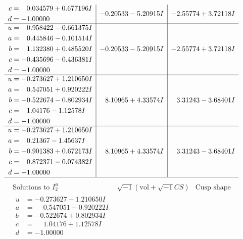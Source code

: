\documentclass[1p]{elsarticle_modified}
\theoremstyle{definition}
\newcommand{\I}{\sqrt{-1}}
\begin{document}
$$\begin{array}{c|c|c}
\begin{aligned}
c &= \phantom{-}0.034579 + 0.677196 I \\
d &= -1.00000\phantom{ +0.000000I}\end{aligned}
 & -0.20533 - 5.20915 I & -2.55774 + 3.72118 I \\ \hline\begin{aligned}
u &= \phantom{-}0.958422 - 0.661375 I \\
a &= \phantom{-}0.445846 - 0.101514 I \\
b &= \phantom{-}1.132380 + 0.485520 I \\
c &= -0.435696 - 0.436381 I \\
d &= -1.00000\phantom{ +0.000000I}\end{aligned}
 & -0.20533 - 5.20915 I & -2.55774 + 3.72118 I \\ \hline\begin{aligned}
u &= -0.273627 + 1.210650 I \\
a &= \phantom{-}0.547051 + 0.920222 I \\
b &= -0.522674 - 0.802934 I \\
c &= \phantom{-}1.04176 - 1.12578 I \\
d &= -1.00000\phantom{ +0.000000I}\end{aligned}
 & \phantom{-}8.10965 + 4.33574 I & \phantom{-}3.31243 - 3.68401 I \\ \hline\begin{aligned}
u &= -0.273627 + 1.210650 I \\
a &= \phantom{-}0.21367 - 1.45637 I \\
b &= -0.901383 + 0.672173 I \\
c &= \phantom{-}0.872371 - 0.074382 I \\
d &= -1.00000\phantom{ +0.000000I}\end{aligned}
 & \phantom{-}8.10965 + 4.33574 I & \phantom{-}3.31243 - 3.68401 I\\
 \hline 
 \end{array}$$\newpage$$\begin{array}{c|c|c}  
\text{Solutions to }I^u_{2}& \I (\text{vol} + \sqrt{-1}CS) & \text{Cusp shape}\\
 \hline 
\begin{aligned}
u &= -0.273627 - 1.210650 I \\
a &= \phantom{-}0.547051 - 0.920222 I \\
b &= -0.522674 + 0.802934 I \\
c &= \phantom{-}1.04176 + 1.12578 I \\
d &= -1.00000\phantom{ +0.000000I}\end{aligned}

\end{array}$$
\end{document}
